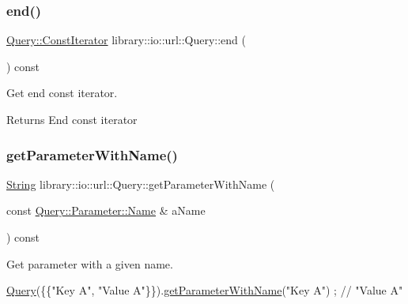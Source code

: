 \subsubsection{\texorpdfstring{end()}{end()}}
{\footnotesize\ttfamily \hyperlink{classlibrary_1_1io_1_1url_1_1_query_a244b3517cf5a3d1abf7e8c8d9d40cf04}{Query\+::\+Const\+Iterator} library\+::io\+::url\+::\+Query\+::end (\begin{DoxyParamCaption}{ }\end{DoxyParamCaption}) const}



Get end const iterator. 

\begin{DoxyReturn}{Returns}
End const iterator 
\end{DoxyReturn}
\mbox{\label{classlibrary_1_1io_1_1url_1_1_query_a5d279ba3f21372fb4768d32a74492b85}} 
\subsubsection{\texorpdfstring{get\+Parameter\+With\+Name()}{getParameterWithName()}}
{\footnotesize\ttfamily \hyperlink{namespacelibrary_1_1io_a7469b45835a4421045db344d6a5a1f85}{String} library\+::io\+::url\+::\+Query\+::get\+Parameter\+With\+Name (\begin{DoxyParamCaption}\item[{const \hyperlink{classlibrary_1_1io_1_1url_1_1_query_1_1_parameter_a7edf5fb8a4ae57aed1ce5dfa2405c981}{Query\+::\+Parameter\+::\+Name} \&}]{a\+Name }\end{DoxyParamCaption}) const}



Get parameter with a given name. 


\begin{DoxyCode}
\hyperlink{classlibrary_1_1io_1_1url_1_1_query_a6781de8f7b7251f8e17c191434b08039}{Query}(\{\{\textcolor{stringliteral}{"Key A"}, \textcolor{stringliteral}{"Value A"}\}\}).\hyperlink{classlibrary_1_1io_1_1url_1_1_query_a5d279ba3f21372fb4768d32a74492b85}{getParameterWithName}(\textcolor{stringliteral}{"Key A"}) ; \textcolor{comment}{// "Value A"}
\end{DoxyCode}




